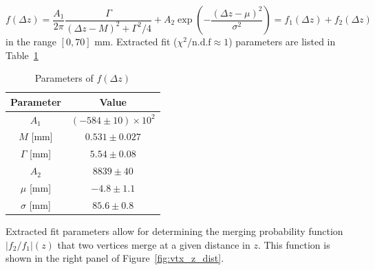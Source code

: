   \begin{equation}
      f(\Delta z) = \frac{A_1}{2\pi}\frac{\Gamma}{(\Delta z - M)^2 + \Gamma^2/4} + A_2\exp{\left(-\frac{(\Delta z - \mu)^2} {\sigma^2} \right)} = f_1(\Delta z) + f_2(\Delta z)
  \end{equation}
  in the range $[0,70]$ mm. Extracted fit ($\chi^2/\text{n.d.f}\approx 1$) parameters are listed in Table~\ref{tab:bw_gaus_pars} 
  \begin{table}[h]
      \centering
      \caption{Parameters of $f(\Delta z)$}
      \begin{tabular}{c|c}
           Parameter & Value  \\
           \hline
           $A_1$ & $(-584\pm 10)\times10^2$ \\
           $M$ [mm] & $0.531 \pm 0.027$ \\
           $\Gamma$ [mm] & $5.54 \pm 0.08$ \\
           $A_2$ & $8839 \pm 40$ \\
           $\mu$ [mm] & $-4.8 \pm 1.1$ \\
           $\sigma$ [mm] & $85.6 \pm 0.8$ \\
      \end{tabular}
      \label{tab:bw_gaus_pars}
  \end{table}
Extracted fit parameters allow for determining the merging probability function $|f_2/f_1|(z)$ 
that two vertices merge at a given distance in $z$. This function is shown in the right panel of Figure~\ref{fig:vtx_z_dist}.

